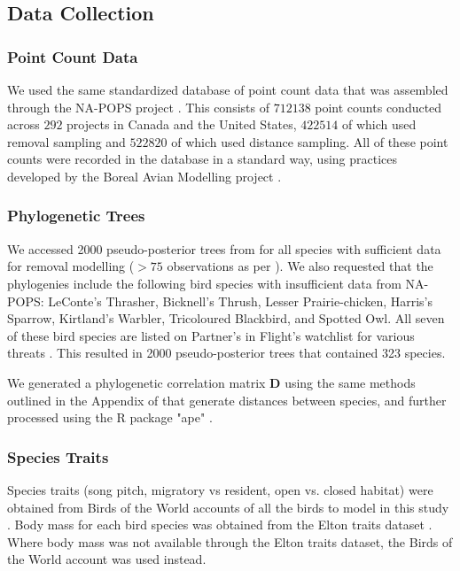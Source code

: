 \documentclass[12pt]{article}
\begin{document}
\subsection{Data Collection}
\subsubsection{Point Count Data}
\par We used the same standardized database of point count data that was assembled through the NA-POPS project \cite{edwards_point_2023}. 
This consists of $712138$ point counts conducted across $292$ projects in Canada and the United States, $422514$ of which used removal sampling and $522820$ of which used distance sampling.
All of these point counts were recorded in the database in a standard way, using practices developed by the Boreal Avian Modelling project \citep{barker_ecological_2015}.

\subsubsection{Phylogenetic Trees}
\par We accessed 2000 pseudo-posterior trees from \citet{jetz_global_2012} for all species with sufficient data for removal modelling ($>75$ observations as per \cite{edwards_point_2023,solymos_evaluating_2018,buckland_introduction_2001}). 
We also requested that the phylogenies include the following bird species with insufficient data from NA-POPS: LeConte's Thrasher, Bicknell's Thrush, Lesser Prairie-chicken, Harris's Sparrow, Kirtland's Warbler, Tricoloured Blackbird, and Spotted Owl. 
All seven of these bird species are listed on Partner's in Flight's watchlist for various threats \citep{will_handbook_2020}. 
This resulted in 2000 pseudo-posterior trees that contained 323 species.

\par We generated a phylogenetic correlation matrix $\mathbf{D}$ using the same methods outlined in the Appendix of \citet{solymos_phylogeny_2018} that generate distances between species, and further processed using the R package "ape" \citet{paradis_ape_2019}.

\subsubsection{Species Traits}
\par Species traits (song pitch, migratory vs resident, open vs. closed habitat) were obtained from Birds of the World accounts of all the birds to model in this study \citep{billerman_birds_2022}. 
Body mass for each bird species was obtained from the Elton traits dataset \citep{wilman_eltontraits_2014}. 
Where body mass was not available through the Elton traits dataset, the Birds of the World account \citep{billerman_birds_2022} was used instead.
\end{document}
